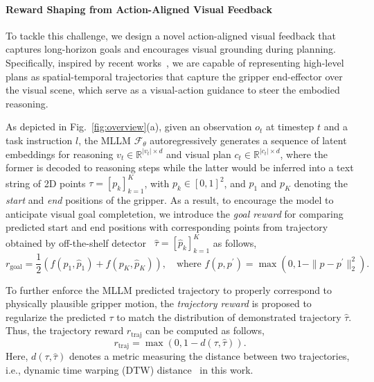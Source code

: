 \paragraph{Reward Shaping from Action-Aligned Visual Feedback}
To tackle this challenge, we design a novel action-aligned visual feedback that captures long-horizon goals and encourages visual grounding during planning. Specifically, inspired by recent works~\cite{yang2025magma,zheng2024tracevla}, we are capable of representing high-level plans as spatial-temporal trajectories that capture the gripper end-effector over the visual scene, which serve as a visual-action guidance to steer the embodied reasoning.


As depicted in Fig.~\ref{fig:overview}(a), given an observation $o_t$ at timestep $t$ and a task instruction $l$, the MLLM $\mathcal{F}_\theta$ autoregressively generates a sequence of latent embeddings for reasoning $v_t \in \mathbb{R}^{|v_t| \times d}$ and visual plan $c_t \in \mathbb{R}^{|c_t| \times d}$, where the former is decoded to reasoning steps while the latter would be inferred into a text string of 2D points $\tau = \left[p_k\right]_{k=1}^K$, with $p_k \in [0, 1]^2$, and $p_1$ and $p_K$ denoting the \emph{start} and \emph{end} positions of the gripper.
As a result, to encourage the model to anticipate visual goal completetion, we introduce the \emph{goal reward} for comparing  predicted start and end positions with corresponding points from trajectory obtained by off-the-shelf detector~\cite{niu2024llarva} $\hat{\tau} = \left[\hat{p}_k\right]_{k=1}^K$ as follows,
\begin{equation}
    r_{\text{goal}} = \frac{1}{2} \left( f\left( p_1, \hat{p}_1 \right) + f\left( p_K, \hat{p}_K \right) \right), \quad \text{where } f(p, p^\prime) = \max\left( 0, 1-\| p - p^\prime \|_2^2 \right).
\end{equation}


To further enforce the MLLM predicted trajectory to properly correspond to physically plausible gripper motion, the \emph{trajectory reward} is proposed to regularize the predicted $\tau$ to match the distribution of demonstrated trajectory $\hat{\tau}$. Thus, the trajectory reward $r_{\text{traj}}$ can be computed as follows,
\begin{equation}
    r_{\text{traj}} = \max\left( 0, 1 - d(\tau, \hat{\tau}) \right).
\end{equation}
Here, $d(\tau, \hat{\tau})$ denotes a metric measuring the distance between two trajectories, i.e., dynamic time warping (DTW) distance~\cite{senin2008dynamic} in this work.

